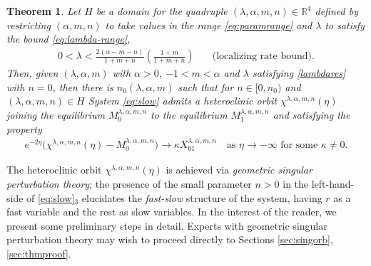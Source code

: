 \documentclass[usletter,11pt]{article}
\newtheorem{theorem}{Theorem}
\theoremstyle{remark}
\begin{document}
\begin{theorem} \label{thm1}
Let $H$ be a domain for the quadruple $(\lambda,\alpha,m,n)\in\mathbb{R}^4$ defined by restricting $(\alpha,m,n)$ to take values in the range
\eqref{eq:paramrange} and $\lambda$ to satisfy the bound \eqref{eq:lambda-range},
 \begin{align}
 \label{lambdares}
  0< \lambda < \frac{2(\alpha-m-n)}{1+m+n}\left(\frac{1+m}{1+m+n}\right) \quad&\text{(localizing rate bound)}. %
\end{align}
Then, given $(\lambda,\alpha,m)$ with $\alpha > 0$, $-1 < m < \alpha$ and $\lambda$ satisfying \eqref{lambdares} with $n=0$, then there is
$n_0( \lambda,\alpha,m)$ such that for $n \in [0, n_0)$ and $(\lambda,\alpha,m,n) \in H$ System \eqref{eq:slow}  admits a heteroclinic orbit $\chi^{\lambda,\alpha,m,n}(\eta)$ joining the equilibrium $M_0^{\lambda,\alpha,m,n}$ to the equilibrium $M_1^{\lambda,\alpha,m,n}$ and satisfying the property
    \begin{align}
     \label{eq:rapid}
        e^{-2\eta}\big(\chi^{\lambda,\alpha,m,n}(\eta) - M_0^{\lambda,\alpha,m,n}\big) \rightarrow \kappa X_{01}^{\lambda,\alpha,m,n} \quad \text{as $\eta \rightarrow -\infty$ for some $\kappa\ne0$}.
    \end{align}
\end{theorem}

The heteroclinic orbit $\chi^{\lambda,\alpha,m,n}(\eta)$ is achieved via {\it geometric singular perturbation theory}; the presence of the small parameter $n>0$ in the left-hand-side of \eqref{eq:slow}$_3$ elucidates the {\it fast-slow} structure of the system, having $r$ as a fast variable and the rest as slow variables.  
In the interest of the reader, we present some preliminary steps in detail. Experts with geometric singular
perturbation theory may wish to proceed directly to Sections \ref{sec:singorb}, \ref{sec:thmproof}. 
\end{document}
